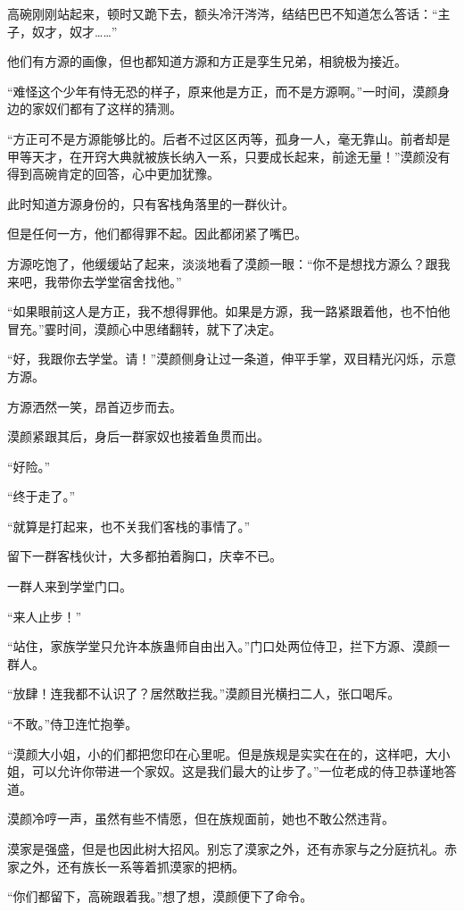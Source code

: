 \begin{this_body}
高碗刚刚站起来，顿时又跪下去，额头冷汗涔涔，结结巴巴不知道怎么答话：“主子，奴才，奴才……”

他们有方源的画像，但也都知道方源和方正是孪生兄弟，相貌极为接近。

“难怪这个少年有恃无恐的样子，原来他是方正，而不是方源啊。”一时间，漠颜身边的家奴们都有了这样的猜测。

“方正可不是方源能够比的。后者不过区区丙等，孤身一人，毫无靠山。前者却是甲等天才，在开窍大典就被族长纳入一系，只要成长起来，前途无量！”漠颜没有得到高碗肯定的回答，心中更加犹豫。

此时知道方源身份的，只有客栈角落里的一群伙计。

但是任何一方，他们都得罪不起。因此都闭紧了嘴巴。

方源吃饱了，他缓缓站了起来，淡淡地看了漠颜一眼：“你不是想找方源么？跟我来吧，我带你去学堂宿舍找他。”

“如果眼前这人是方正，我不想得罪他。如果是方源，我一路紧跟着他，也不怕他冒充。”霎时间，漠颜心中思绪翻转，就下了决定。

“好，我跟你去学堂。请！”漠颜侧身让过一条道，伸平手掌，双目精光闪烁，示意方源。

方源洒然一笑，昂首迈步而去。

漠颜紧跟其后，身后一群家奴也接着鱼贯而出。

“好险。”

“终于走了。”

“就算是打起来，也不关我们客栈的事情了。”

留下一群客栈伙计，大多都拍着胸口，庆幸不已。

一群人来到学堂门口。

“来人止步！”

“站住，家族学堂只允许本族蛊师自由出入。”门口处两位侍卫，拦下方源、漠颜一群人。

“放肆！连我都不认识了？居然敢拦我。”漠颜目光横扫二人，张口喝斥。

“不敢。”侍卫连忙抱拳。

“漠颜大小姐，小的们都把您印在心里呢。但是族规是实实在在的，这样吧，大小姐，可以允许你带进一个家奴。这是我们最大的让步了。”一位老成的侍卫恭谨地答道。

漠颜冷哼一声，虽然有些不情愿，但在族规面前，她也不敢公然违背。

漠家是强盛，但是也因此树大招风。别忘了漠家之外，还有赤家与之分庭抗礼。赤家之外，还有族长一系等着抓漠家的把柄。

“你们都留下，高碗跟着我。”想了想，漠颜便下了命令。


\end{this_body}
